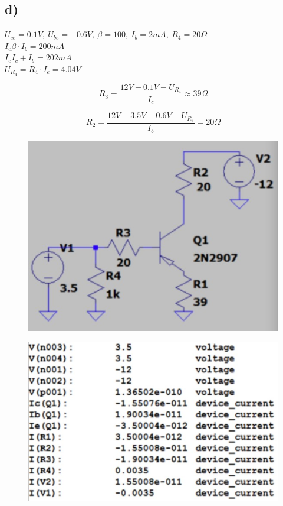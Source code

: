 \documentclass{article}
\begin{document}
\newpage

\subsection{d)}

$U_{ce}=0.1V, \ U_{be}=-0.6V, \ \beta = 100, \ I_{b} = 2mA, \ R_{4} = 20\Omega$\\
$I_{c}\beta \cdot I_{b} = 200mA$\\
$I_{e} I_{c} + I_{b} = 202mA$\\
$U_{R_{4}} = R_{4} \cdot I_{e}=4.04V$

$$
    R_{3} = \frac{12V-0.1V-U_{R_{4}}}{I_{c}}\approx 39\Omega
$$

$$
    R_{2} = \frac{12V - 3.5V -0.6V -U_{R_{3}}}{I_{b}}=20\Omega
$$

\begin{figure}[h!]
    \centering
    \includegraphics[scale=0.35]{rys6_model.jpg}
\end{figure}

\begin{figure}[h!]
    \centering
    \includegraphics[scale=0.4]{rys6_num.jpg}
\end{figure}
\end{document}
